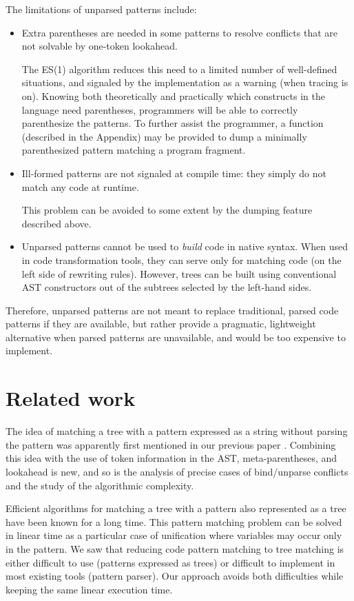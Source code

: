 \documentclass{sigplanconf}
\begin{document}
The limitations of unparsed patterns include:
\begin{itemize}
\item Extra parentheses are needed in some patterns to resolve
conflicts that are not solvable by one-token lookahead. 

The ES(1) algorithm reduces this need to a limited number of
well-defined situations, and signaled by the implementation as a
warning (when tracing is on). Knowing both theoretically and
practically which constructs in the language need parentheses,
programmers will be able to correctly parenthesize the patterns. To
further assist the programmer, a function (described in the Appendix)
may be provided to dump a minimally parenthesized pattern matching a
program fragment.

\item Ill-formed patterns are not signaled at compile time: they
simply do not match any code at runtime.

This problem can be avoided to some extent by the dumping feature
described above.

\item Unparsed patterns cannot be used to {\em build} code in native
syntax. When used in code transformation tools, they can serve only
for matching code (on the left side of rewriting rules). However,
trees can be built using conventional AST constructors out of the
subtrees selected by the left-hand sides.

\end{itemize}

Therefore, unparsed patterns are not meant to replace traditional,
parsed code patterns if they are available, but rather provide a
pragmatic, lightweight alternative when parsed patterns are
unavailable, and would be too expensive to implement.

\section{Related work}
\label{relwork}
The idea of matching a tree with a pattern expressed as a string
without parsing the pattern was apparently first mentioned in our
previous paper \cite{ppdp}. Combining this idea with the use of
token information in the AST, meta-parentheses, and lookahead is new,
and so is the analysis of precise cases of bind/unparse conflicts and
the study of the algorithmic complexity.

Efficient algorithms for matching a tree with a pattern also
represented as a tree have been known for a long time. This pattern
matching problem can be solved in linear time as a particular case of
unification \cite{unification} where variables may occur only in the
pattern. We saw that reducing code pattern matching to tree matching
is either difficult to use (patterns expressed as trees) or difficult
to implement in most existing tools (pattern parser). Our approach
avoids both difficulties while keeping the same linear execution time.
\end{document}
